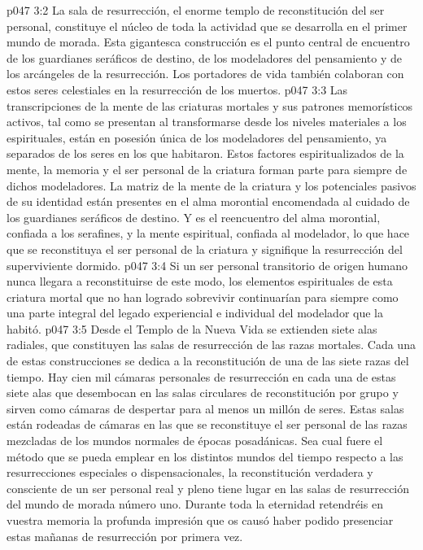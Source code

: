 \vs p047 3:2 La sala de resurrección, el enorme templo de reconstitución del ser personal, constituye el núcleo de toda la actividad que se desarrolla en el primer mundo de morada. Esta gigantesca construcción es el punto central de encuentro de los guardianes seráficos de destino, de los modeladores del pensamiento y de los arcángeles de la resurrección. Los portadores de vida también colaboran con estos seres celestiales en la resurrección de los muertos.
\vs p047 3:3 Las transcripciones de la mente de las criaturas mortales y sus patrones memorísticos activos, tal como se presentan al transformarse desde los niveles materiales a los espirituales, están en posesión única de los modeladores del pensamiento, ya separados de los seres en los que habitaron. Estos factores espiritualizados de la mente, la memoria y el ser personal de la criatura forman parte para siempre de dichos modeladores. La matriz de la mente de la criatura y los potenciales pasivos de su identidad están presentes en el alma morontial encomendada al cuidado de los guardianes seráficos de destino. Y es el reencuentro del alma morontial, confiada a los serafines, y la mente espiritual, confiada al modelador, lo que hace que se reconstituya el ser personal de la criatura y signifique la resurrección del superviviente dormido.
\vs p047 3:4 Si un ser personal transitorio de origen humano nunca llegara a reconstituirse de este modo, los elementos espirituales de esta criatura mortal que no han logrado sobrevivir continuarían para siempre como una parte integral del legado experiencial e individual del modelador que la habitó.
\vs p047 3:5 Desde el Templo de la Nueva Vida se extienden siete alas radiales, que constituyen las salas de resurrección de las razas mortales. Cada una de estas construcciones se dedica a la reconstitución de una de las siete razas del tiempo. Hay cien mil cámaras personales de resurrección en cada una de estas siete alas que desembocan en las salas circulares de reconstitución por grupo y sirven como cámaras de despertar para al menos un millón de seres. Estas salas están rodeadas de cámaras en las que se reconstituye el ser personal de las razas mezcladas de los mundos normales de épocas posadánicas. Sea cual fuere el método que se pueda emplear en los distintos mundos del tiempo respecto a las resurrecciones especiales o dispensacionales, la reconstitución verdadera y consciente de un ser personal real y pleno tiene lugar en las salas de resurrección del mundo de morada número uno. Durante toda la eternidad retendréis en vuestra memoria la profunda impresión que os causó haber podido presenciar estas mañanas de resurrección por primera vez.
